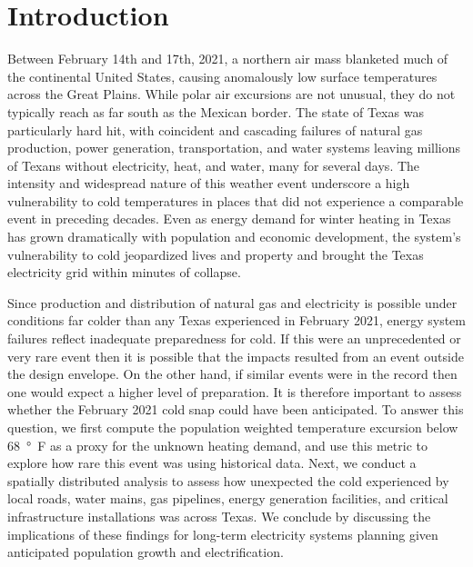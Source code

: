 \documentclass[12pt]{iopart}
\begin{document}
\submitto{\ERL}
\maketitle

\section{Introduction}

Between February 14th and 17th, 2021, a northern air mass blanketed much of the continental United States, causing anomalously low surface temperatures across the Great Plains.
While polar air excursions are not unusual, they do not typically reach as far south as the Mexican border.
The state of Texas was particularly hard hit, with coincident and cascading failures of natural gas production, power generation, transportation, and water systems leaving millions of Texans without electricity, heat, and water, many for several days.
The intensity and widespread nature of this weather event underscore a high vulnerability to cold temperatures in places that did not experience a comparable event in preceding decades.
Even as energy demand for winter heating in Texas has grown dramatically with population and economic development, the system’s vulnerability to cold jeopardized lives and property and brought the Texas electricity grid within minutes of collapse.

Since production and distribution of natural gas and electricity is possible under conditions far colder than any Texas experienced in February 2021, energy system failures reflect inadequate preparedness for cold.
If this were an unprecedented or very rare event then it is possible that the impacts resulted from an event outside the design envelope.
On the other hand, if similar events were in the record then one would expect a higher level of preparation.
It is therefore important to assess whether the February 2021 cold snap could have been anticipated.
To answer this question, we first compute the population weighted temperature excursion below \SI{68}{\degree F} as a proxy for the unknown heating demand, and use this metric to explore how rare this event was using historical data.
Next, we conduct a spatially distributed analysis to assess how unexpected the cold experienced by local roads, water mains, gas pipelines, energy generation facilities, and critical infrastructure installations was across Texas.
We conclude by discussing the implications of these findings for long-term electricity systems planning given anticipated population growth and electrification.
\end{document}
